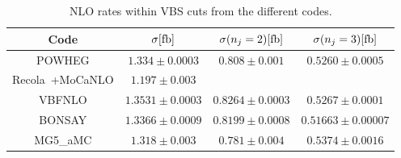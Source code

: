 \documentclass[a4paper,10pt]{report}
\begin{document}
\begin{table}[h!]
    \begin{tabular}{c|c|c|c}
        Code  &  $\sigma[\rm{fb}]$  &  $\sigma(n_j=2)[\rm{fb}]$  &  $\sigma(n_j=3)[\rm{fb}]$\\
        \hline
        \hline
        {\sc POWHEG}  &  $1.334 \pm 0.0003$  &  $0.808 \pm  0.001$  &  $0.5260 \pm 0.0005$\\
        {\sc Recola}\ +{\sc MoCaNLO}  &  $1.197 \pm 0.003 $ \\
        {\sc VBFNLO}  &  $1.3531 \pm 0.0003$  &  $0.8264 \pm  0.0003$  &  $0.5267 \pm 0.0001$\\
        {\sc BONSAY}  &  $1.3366 \pm 0.0009$  &  $0.8199 \pm  0.0008$  &  $0.51663 \pm 0.00007$ \\
        {\sc MG5\_aMC}&  $1.318  \pm 0.003$  &  $0.781 \pm  0.004$  &  $0.5374 \pm 0.0016$\\
    \end{tabular}
    \caption{\label{tab:NLOrates} NLO rates within VBS cuts from the different codes.}
\end{table}
\end{document}
